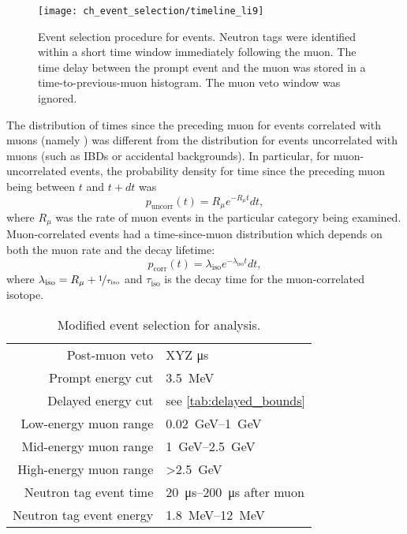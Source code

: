 \begin{figure}
    \centering
    \texttt{[image: ch\_event\_selection/timeline\_li9]}
    \caption[\li{}/\he{} event selection]{
        Event selection procedure for \li{} events.
        Neutron tags were identified within a short time window
        immediately following the muon.
        The time delay between the prompt event and the muon
        was stored in a time-to-previous-muon histogram.
        The muon veto window was ignored.
    }
    \label{fig:li9_timeline}
\end{figure}

The distribution of times since the preceding muon
for events correlated with muons (namely \li{})
was different from the distribution for events uncorrelated with muons
(such as IBDs or accidental backgrounds).
In particular, for muon-uncorrelated events,
the probability density for time since the preceding muon
being between $t$ and $t + dt$ was \cite{chris_li9}
\begin{equation}\label{eq:li9_muon_uncorr}
    p_\text{uncorr}(t) = R_\mu e^{-R_\mu t}dt,
\end{equation}
where $R_\mu$ was the rate of muon events in the particular category being examined.
Muon-correlated events had a time-since-muon distribution
which depends on both the muon rate and the decay lifetime:
\begin{equation}\label{eq:li9_muon_corr}
    p_\text{corr}(t) = \lambda_\text{iso} e^{-\lambda_\text{iso} t}dt,
\end{equation}
where $\lambda_\text{iso} = R_\mu + \nicefrac{1}{\tau_\text{iso}}$
and $\tau_\text{iso}$ is the decay time
for the muon-correlated isotope.

\begin{table}
    \centering
    \caption[\li{}/\he{} event selection]{Modified event selection for \li{} analysis.}
    \label{tab:li9}
    \begin{tabular}[t]{rl}
        \toprule
        Post-muon veto & XYZ \si{\us} \\
        Prompt energy cut & \SI{3.5}{\MeV} \\
        Delayed energy cut & see \cref{tab:delayed_bounds} \\
        Low-energy muon range & \SIrange{0.02}{1}{\GeV} \\
        Mid-energy muon range & \SIrange{1}{2.5}{\GeV} \\
        High-energy muon range & \SI{>2.5}{\GeV} \\
        Neutron tag event time & \SIrange{20}{200}{\us} after muon \\
        Neutron tag event energy & \SIrange{1.8}{12}{\MeV} \\
        \bottomrule
    \end{tabular}
\end{table}

